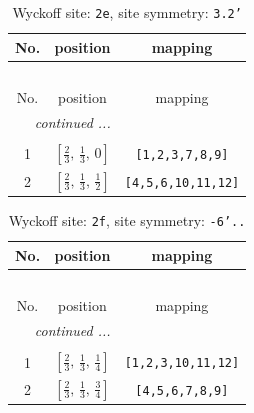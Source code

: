 \documentclass[fleqn,8pt]{jsarticle}
\begin{document}
\begin{longtable}{ccc}
\caption{Wyckoff site: {\tt 2e}, site symmetry: {\tt 3.2'}}
 \\
 \hline \hline
No. & position & mapping \\ \hline \endfirsthead

\multicolumn{2}{l}{\tablename\ \thetable{}} \\
 \hline \hline
No. & position & mapping \\ \hline \endhead

 \hline \hline
\multicolumn{2}{r}{\footnotesize\it continued ...} \\ \endfoot

 \hline \hline
\multicolumn{2}{r}{} \\ \endlastfoot

1 & $\left[ \frac{2}{3},\, \frac{1}{3},\, 0 \right]$ & {\tt [1,2,3,7,8,9]} \\ \hline
2 & $\left[ \frac{2}{3},\, \frac{1}{3},\, \frac{1}{2} \right]$ & {\tt [4,5,6,10,11,12]} \\
\end{longtable}
\renewcommand{\arraystretch}{1.2}
\begin{longtable}{ccc}
\caption{Wyckoff site: {\tt 2f}, site symmetry: {\tt -6'..}}
 \\
 \hline \hline
No. & position & mapping \\ \hline \endfirsthead

\multicolumn{2}{l}{\tablename\ \thetable{}} \\
 \hline \hline
No. & position & mapping \\ \hline \endhead

 \hline \hline
\multicolumn{2}{r}{\footnotesize\it continued ...} \\ \endfoot

 \hline \hline
\multicolumn{2}{r}{} \\ \endlastfoot

1 & $\left[ \frac{2}{3},\, \frac{1}{3},\, \frac{1}{4} \right]$ & {\tt [1,2,3,10,11,12]} \\ \hline
2 & $\left[ \frac{2}{3},\, \frac{1}{3},\, \frac{3}{4} \right]$ & {\tt [4,5,6,7,8,9]} \\
\end{longtable}
\renewcommand{\arraystretch}{1.2}
\end{document}

